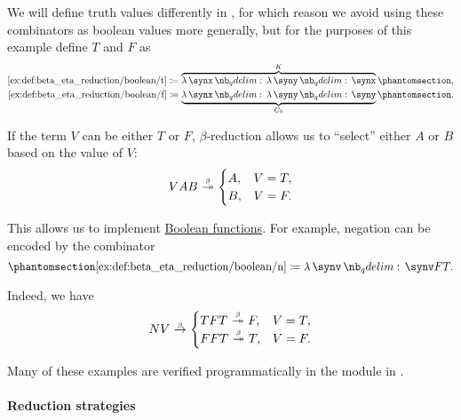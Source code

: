 \begin{example}
\begin{thmenum}
    We will define truth values differently in , for which reason we avoid using these combinators as boolean values more generally, but for the purposes of this example define \( T \) and \( F \) as
    \begin{align*}
      \ref{ex:def:beta_eta_reduction/boolean/t} &\coloneqq \overbrace{\qabs \synx \qabs \syny \synx}^K \taglabel[T]{ex:def:beta_eta_reduction/boolean/t}, \\
      \ref{ex:def:beta_eta_reduction/boolean/f} &\coloneqq \underbrace{\qabs \synx \qabs \syny \syny}_{C_0} \taglabel[F]{ex:def:beta_eta_reduction/boolean/f}.
    \end{align*}

    If the term \( V \) can be either \( T \) or \( F \), \( \beta \)-reduction allows us to \enquote{select} either \( A \) or \( B \) based on the value of \( V \):
    \begin{equation}\label{ex:def:beta_eta_reduction/boolean/if}
      VAB \bred* \begin{cases}
        A, &V = T, \\
        B, &V = F.
      \end{cases}
    \end{equation}

    This allows us to implement \hyperref[def:boolean_function]{Boolean functions}. For example, negation can be encoded by the combinator
    \begin{equation*}\taglabel[N]{ex:def:beta_eta_reduction/boolean/n}
      \ref{ex:def:beta_eta_reduction/boolean/n} \coloneqq \qabs \synv \synv F T.
    \end{equation*}

    Indeed, we have
    \begin{equation*}
      NV \bred \begin{cases}
        TFT \bred* F, &V = T, \\
        FFT \bred* T, &V = F.
      \end{cases}
    \end{equation*}
  \end{thmenum}
\end{example}
\begin{comments}
  \item Many of these examples are verified programmatically in the module  in \cite{notebook:code}.
\end{comments}

\paragraph{Reduction strategies}


